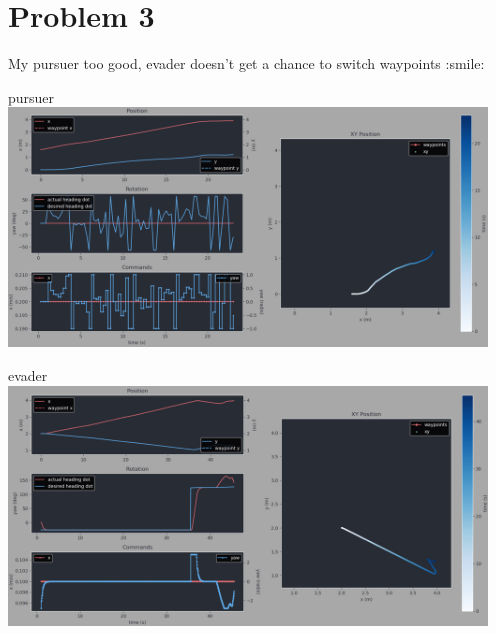 \documentclass{article}
\begin{document}
    \newpage
    \section*{Problem 3}

    My pursuer too good, evader doesn't get a chance to switch waypoints :smile: 

    \begin{center}
        pursuer \break
        \includegraphics[width=5in]{pursuer_random_evader_1.png} \break

        evader \break
        \includegraphics[width=5in]{evader_random_evader_1.png}
    \end{center}
\end{document}
